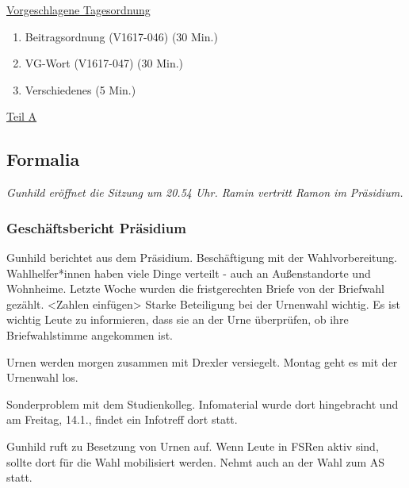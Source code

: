 \documentclass[ngerman,headheight=70pt]{scrartcl}
\begin{document}
    \newpage
    \underline{Vorgeschlagene Tagesordnung}
    \begin{enumerate}[label={\textbf{Top \theenumi}},leftmargin=*]
        \item Beitragsordnung (V1617-046) (30 Min.)
        \item VG-Wort (V1617-047) (30 Min.)
        \item Verschiedenes (5 Min.)
    \end{enumerate}

    \newpage


    {\Large \underline{Teil A}}

    \subsection{Formalia}

    \textit{
    Gunhild eröffnet die Sitzung um 20.54 Uhr. Ramin vertritt Ramon im Präsidium.
    }

    \subsubsection{Geschäftsbericht Präsidium}

    Gunhild berichtet aus dem Präsidium. Beschäftigung mit der Wahlvorbereitung.
    Wahlhelfer*innen haben viele Dinge verteilt - auch an Außenstandorte und
    Wohnheime. Letzte Woche wurden die fristgerechten Briefe von der Briefwahl
    gezählt. <Zahlen einfügen> Starke Beteiligung bei der Urnenwahl wichtig.
    Es ist wichtig Leute zu informieren, dass sie an der Urne überprüfen, ob
    ihre Briefwahlstimme angekommen ist.

    Urnen werden morgen zusammen mit Drexler versiegelt. Montag geht es mit der
    Urnenwahl los.

    Sonderproblem mit dem Studienkolleg. Infomaterial wurde dort hingebracht
    und am Freitag, 14.1., findet ein Infotreff dort statt.

    Gunhild ruft zu Besetzung von Urnen auf. Wenn Leute in FSRen aktiv sind, sollte
    dort für die Wahl mobilisiert werden. Nehmt auch an der Wahl zum AS statt.
\end{document}
